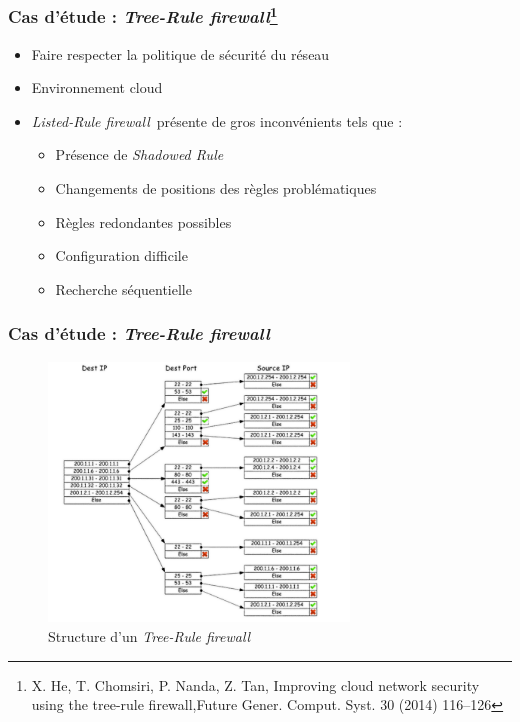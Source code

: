 \documentclass{beamer}
\begin{document}


\begin{frame}
\frametitle{Cas d'étude : \textit{Tree-Rule firewall}\footnote[frame]{X. He, T. Chomsiri, P. Nanda, Z. Tan, Improving cloud network security using the tree-rule firewall,Future Gener. Comput. Syst. 30 (2014) 116–126}}
\begin{itemize}
	\item Faire respecter la politique de sécurité du réseau
	\item Environnement cloud
	\item \textit{Listed-Rule firewall} présente de gros inconvénients tels que :
		\begin{itemize}
			\item Présence de \textit{Shadowed Rule}
			\item Changements de positions des règles problématiques
			\item Règles redondantes possibles
			\item Configuration difficile
			\item Recherche séquentielle
		\end{itemize}
\end{itemize}
\end{frame}



\begin{frame}
\frametitle{Cas d'étude : \textit{Tree-Rule firewall}}
\begin{figure}
	\centering
	\captionsetup{justification=centering}
	\includegraphics[width=8cm]{./pics/tree_rule_firewall.png}
	\caption{Structure d'un \textit{Tree-Rule firewall}}
	\label{figure3}
\end{figure}
\end{frame}
\end{document}
